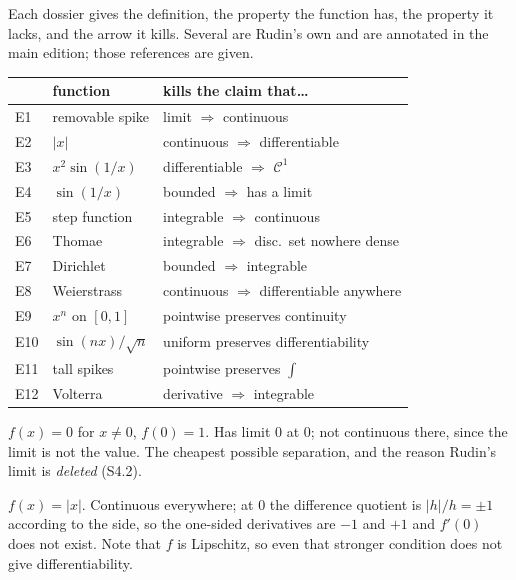 
\begin{roadmap}
Each dossier gives the definition, the property the function has, the
property it lacks, and the arrow it kills. Several are Rudin's own and are
annotated in the main edition; those references are given.

\medskip
\raggedright
\begin{tabular}{@{}l l l@{}}
\toprule
& \textbf{function} & \textbf{kills the claim that\ldots} \\
\midrule
E1  & removable spike            & limit $\Rightarrow$ continuous \\
E2  & $|x|$                      & continuous $\Rightarrow$ differentiable \\
E3  & $x^2\sin(1/x)$             & differentiable $\Rightarrow$ $\mathscr{C}^1$ \\
E4  & $\sin(1/x)$                & bounded $\Rightarrow$ has a limit \\
E5  & step function              & integrable $\Rightarrow$ continuous \\
E6  & Thomae                     & integrable $\Rightarrow$ disc.\ set nowhere dense \\
E7  & Dirichlet                  & bounded $\Rightarrow$ integrable \\
E8  & Weierstrass                & continuous $\Rightarrow$ differentiable anywhere \\
E9  & $x^n$ on $[0,1]$           & pointwise preserves continuity \\
E10 & $\sin(nx)/\sqrt n$         & uniform preserves differentiability \\
E11 & tall spikes                & pointwise preserves $\int$ \\
E12 & Volterra                   & derivative $\Rightarrow$ integrable \\
\bottomrule
\end{tabular}
\end{roadmap}

$f(x)=0$ for $x \ne 0$, $f(0)=1$. Has limit $0$ at $0$; not continuous
there, since the limit is not the value. The cheapest possible separation,
and the reason Rudin's limit is \emph{deleted} (S4.2).

$f(x)=|x|$. Continuous everywhere; at $0$ the difference quotient is
$|h|/h = \pm1$ according to the side, so the one-sided derivatives are $-1$
and $+1$ and $f'(0)$ does not exist. Note that $f$ is Lipschitz, so even
that stronger condition does not give differentiability.

